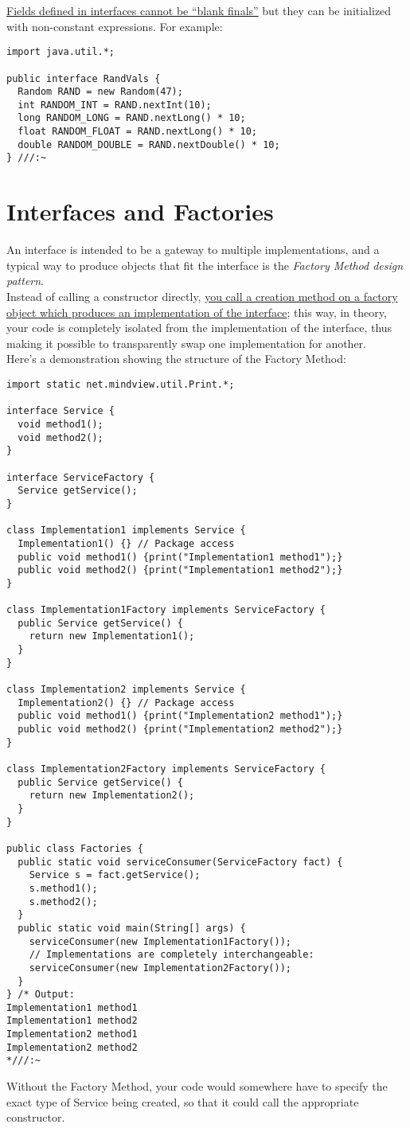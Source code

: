 \documentclass[10pt,letterpaper]{report}
\begin{document}
\underline{Fields defined in interfaces cannot be ``blank finals''} but they can be initialized with non-constant expressions. For example:
\begin{lstlisting}
import java.util.*;

public interface RandVals {
  Random RAND = new Random(47);
  int RANDOM_INT = RAND.nextInt(10);
  long RANDOM_LONG = RAND.nextLong() * 10;
  float RANDOM_FLOAT = RAND.nextLong() * 10;
  double RANDOM_DOUBLE = RAND.nextDouble() * 10;
} ///:~
\end{lstlisting}
\section{Interfaces and Factories}
An interface is intended to be a gateway to multiple implementations, and a typical way to produce objects that fit the interface is the \textit{Factory Method design pattern}.\\
Instead of calling a constructor directly, \underline{you call a creation method on a factory} \underline{object which produces an implementation of the interface}; this way, in theory, your code is completely isolated from the implementation of the interface, thus making it possible to transparently swap one implementation for another.\\
Here's a demonstration showing the structure of the Factory Method:
\begin{lstlisting}
import static net.mindview.util.Print.*;

interface Service {
  void method1();
  void method2();
}

interface ServiceFactory {
  Service getService();
}

class Implementation1 implements Service {
  Implementation1() {} // Package access
  public void method1() {print("Implementation1 method1");}
  public void method2() {print("Implementation1 method2");}
}	

class Implementation1Factory implements ServiceFactory {
  public Service getService() {
    return new Implementation1();
  }
}

class Implementation2 implements Service {
  Implementation2() {} // Package access
  public void method1() {print("Implementation2 method1");}
  public void method2() {print("Implementation2 method2");}
}

class Implementation2Factory implements ServiceFactory {
  public Service getService() {
    return new Implementation2();
  }
}	

public class Factories {
  public static void serviceConsumer(ServiceFactory fact) {
    Service s = fact.getService();
    s.method1();
    s.method2();
  }
  public static void main(String[] args) {
    serviceConsumer(new Implementation1Factory());
    // Implementations are completely interchangeable:
    serviceConsumer(new Implementation2Factory());
  }
} /* Output:
Implementation1 method1
Implementation1 method2
Implementation2 method1
Implementation2 method2
*///:~
\end{lstlisting}
Without the Factory Method, your code would somewhere have to specify the exact type of Service being created, so that it could call the appropriate constructor.\\
\end{document}
